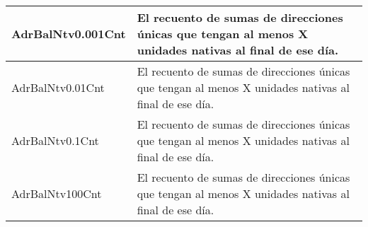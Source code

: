 \begin{table}[h!]
\begin{tabular}{|l|m{12cm}|}
		\hline
		AdrBalNtv0.001Cnt & El recuento de sumas de direcciones únicas que tengan al menos X unidades nativas al final de ese día.                                       \\
		\hline
		AdrBalNtv0.01Cnt  & El recuento de sumas de direcciones únicas que tengan al menos X unidades nativas al final de ese día.                                       \\
		\hline
		AdrBalNtv0.1Cnt   & El recuento de sumas de direcciones únicas que tengan al menos X unidades nativas al final de ese día.                                       \\
		\hline
		AdrBalNtv100Cnt   & El recuento de sumas de direcciones únicas que tengan al menos X unidades nativas al final de ese día.\\
		\hline                                     
	\end{tabular}
\end{table}

